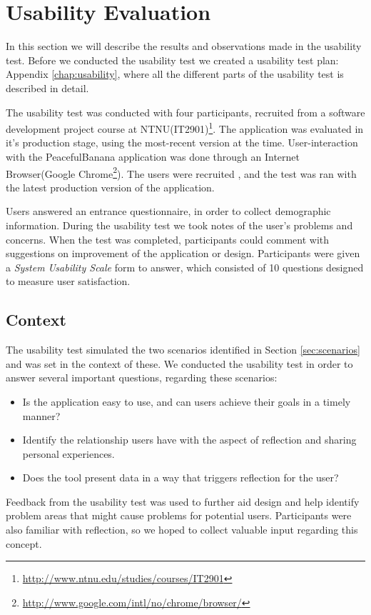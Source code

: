 \section{Usability Evaluation}
In this section we will describe the results and observations made in the usability test. Before we conducted the usability test we created a usability test plan: Appendix \ref{chap:usability}, where all the different parts of the usability test is described in detail.

The usability test was conducted with four participants, recruited from a software development project course at NTNU(IT2901)\footnote{\url{http://www.ntnu.edu/studies/courses/IT2901}}. The application was evaluated in it's production stage, using the most-recent version at the time. User-interaction with the PeacefulBanana application was done through an Internet Browser(Google Chrome\footnote{\url{http://www.google.com/intl/no/chrome/browser/}}). The users were recruited , and the test was ran with the latest production version of the application. 

Users answered an entrance questionnaire, in order to collect demographic information. During the usability test we took notes of the user's problems and concerns. When the test was completed, participants could comment with suggestions on improvement of the application or design. Participants were given a \emph{System Usability Scale} form to answer\citep{brooke1996sus}, which consisted of 10 questions designed to measure user satisfaction. 

\subsection{Context}
\label{subsec:context}
The usability test simulated the two scenarios identified in Section \ref{sec:scenarios} and was set in the context of these. We conducted the usability test in order to answer several important questions, regarding these scenarios: 
\begin{itemize}
	\item Is the application easy to use, and can users achieve their goals in a timely manner?
	\item Identify the relationship users have with the aspect of reflection and sharing personal experiences.
	\item Does the tool present data in a way that triggers reflection for the user?
\end{itemize}
Feedback from the usability test was used to further aid design and help identify problem areas that might cause problems for potential users. Participants were also familiar with reflection, so we hoped to collect valuable input regarding this concept.

